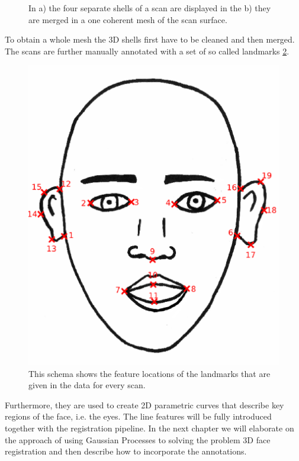 \begin{figure}[h!]
\caption{In a) the four separate shells of a scan are displayed in the b) they are merged in a one coherent mesh of the scan surface.}
\label{fig:scan}
\end{figure}
To obtain a whole mesh the 3D shells first have to be cleaned and then merged.
The scans are further manually annotated with a set of so called landmarks \ref{fig:landmarks}. 
\begin{figure}[h!]
    \centering
    \includegraphics[width=.3\textwidth]{./resources/figures/schema_marked.eps}
    \caption{This schema shows the feature locations of the landmarks that are given in the data for every scan.}
    \label{fig:landmarks}
\end{figure}
Furthermore, they are used to create 2D parametric curves that describe key regions of the face, i.e. the eyes. The line features will be fully introduced together with the registration pipeline. In the next chapter we will elaborate on the approach of using Gaussian Processes to solving the problem 3D face registration and then describe how to incorporate the annotations.

